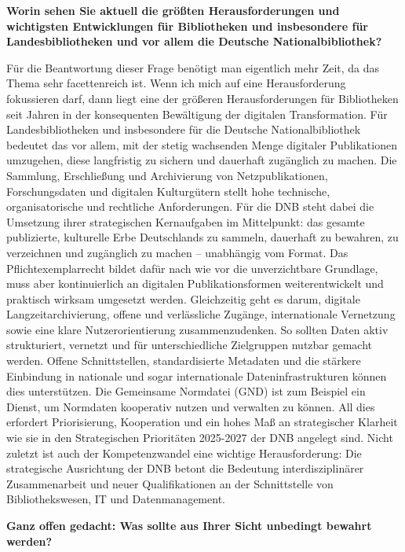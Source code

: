 \documentclass[a4paper,
fontsize=11pt,
oneside,
numbers=noperiodatend,
parskip=half-,
bibliography=totoc,
final
]{scrartcl}
\begin{document}
\textbf{Worin sehen Sie aktuell die größten Herausforderungen und
wichtigsten Entwicklungen für Bibliotheken und insbesondere für
Landesbibliotheken und vor allem die Deutsche Nationalbibliothek?}

Für die Beantwortung dieser Frage benötigt man eigentlich mehr Zeit, da
das Thema sehr facettenreich ist. Wenn ich mich auf eine Herausforderung
fokussieren darf, dann liegt eine der größeren Herausforderungen für
Bibliotheken seit Jahren in der konsequenten Bewältigung der digitalen
Transformation. Für Landesbibliotheken und insbesondere für die Deutsche
Nationalbibliothek bedeutet das vor allem, mit der stetig wachsenden
Menge digitaler Publikationen umzugehen, diese langfristig zu sichern
und dauerhaft zugänglich zu machen. Die Sammlung, Erschließung und
Archivierung von Netzpublikationen, Forschungsdaten und digitalen
Kulturgütern stellt hohe technische, organisatorische und rechtliche
Anforderungen. Für die DNB steht dabei die Umsetzung ihrer strategischen
Kernaufgaben im Mittelpunkt: das gesamte publizierte, kulturelle Erbe
Deutschlands zu sammeln, dauerhaft zu bewahren, zu verzeichnen und
zugänglich zu machen -- unabhängig vom Format. Das Pflichtexemplarrecht
bildet dafür nach wie vor die unverzichtbare Grundlage, muss aber
kontinuierlich an digitalen Publikationsformen weiterentwickelt und
praktisch wirksam umgesetzt werden. Gleichzeitig geht es darum, digitale
Langzeitarchivierung, offene und verlässliche Zugänge, internationale
Vernetzung sowie eine klare Nutzerorientierung zusammenzudenken. So
sollten Daten aktiv strukturiert, vernetzt und für unterschiedliche
Zielgruppen nutzbar gemacht werden. Offene Schnittstellen,
standardisierte Metadaten und die stärkere Einbindung in nationale und
sogar internationale Dateninfrastrukturen können dies unterstützen. Die
Gemeinsame Normdatei (GND) ist zum Beispiel ein Dienst, um Normdaten
kooperativ nutzen und verwalten zu können. All dies erfordert
Priorisierung, Kooperation und ein hohes Maß an strategischer Klarheit
wie sie in den Strategischen Prioritäten 2025-2027 der DNB angelegt
sind. Nicht zuletzt ist auch der Kompetenzwandel eine wichtige
Herausforderung: Die strategische Ausrichtung der DNB betont die
Bedeutung interdisziplinärer Zusammenarbeit und neuer Qualifikationen an
der Schnittstelle von Bibliothekswesen, IT und Datenmanagement.

\textbf{Ganz offen gedacht: Was sollte aus Ihrer Sicht unbedingt bewahrt
werden?}
\end{document}
